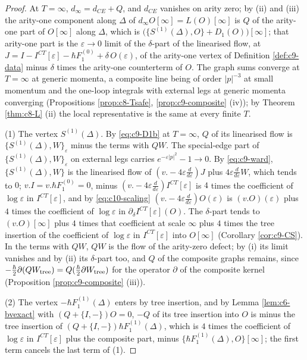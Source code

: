 \begin{proof}
At $T=\infty$, $d_\infty=d_{CE}+Q$, and $d_{CE}$ vanishes on arity zero; by (ii) and (iii) the arity-one component along $\Delta$ of $d_\infty O[\infty]=L(O)[\infty]$ is $Q$ of the arity-one part of $O[\infty]$ along $\Delta$, which is $\big(\{S^{(1)}(\Delta),O\}+D_1(O)\big)[\infty]$; that arity-one part is the $\varepsilon\to0$ limit of the $\delta$-part of the linearised flow, at $J=I-I^{CT}[\varepsilon]-\hbar F_1^{(0)}+\delta\,O(\varepsilon)$, of the arity-one vertex of Definition \ref{def:c9-data} minus $\delta$ times the arity-one counterterm of $O$. The graph sums converge at $T=\infty$ at generic momenta, a composite line being of order $|p|^{-3}$ at small momentum and the one-loop integrals with external legs at generic momenta converging (Propositions \ref{prop:c8-Tsafe}, \ref{prop:c9-composite} (iv)); by Theorem \ref{thm:c8-L} (ii) the local representative is the same at every finite $T$.

(1) The vertex $S^{(1)}(\Delta)$. By \eqref{eq:c9-D1b} at $T=\infty$, $Q$ of its linearised flow is $\{S^{(1)}(\Delta),W\}_\varepsilon$ minus the terms with $QW$. The special-edge part of $\{S^{(1)}(\Delta),W\}_\varepsilon$ on external legs carries $e^{-\varepsilon|p|^2}-1\to0$. By \eqref{eq:c9-ward}, $\{S^{(1)}(\Delta),W\}$ is the linearised flow of $(v.-4\varepsilon\frac d{d\varepsilon})J$ plus $4\varepsilon\frac d{d\varepsilon}W$, which tends to $0$; $v.I=v.\hbar F_1^{(0)}=0$, minus $(v.-4\varepsilon\frac d{d\varepsilon})I^{CT}[\varepsilon]$ is $4$ times the coefficient of $\log\varepsilon$ in $I^{CT}[\varepsilon]$, and by \eqref{eq:c10-scaling} $(v.-4\varepsilon\frac d{d\varepsilon})O(\varepsilon)$ is $(v.O)(\varepsilon)$ plus $4$ times the coefficient of $\log\varepsilon$ in $\partial_\delta I^{CT}[\varepsilon](O)$. The $\delta$-part tends to $(v.O)[\infty]$ plus $4$ times that coefficient at scale $\infty$ plus $4$ times the tree insertion of the coefficient of $\log\varepsilon$ in $I^{CT}[\varepsilon]$ into $O[\infty]$ (Corollary \ref{cor:c9-CS}). In the terms with $QW$, $QW$ is the flow of the arity-zero defect; by (i) its limit vanishes and by (ii) its $\delta$-part too, and $Q$ of the composite graphs remains, since $-\tfrac\hbar2\partial(QW_{\rm tree})=Q(\tfrac\hbar2\partial W_{\rm tree})$ for the operator $\partial$ of the composite kernel (Proposition \ref{prop:c9-composite} (iii)).

(2) The vertex $-\hbar F_1^{(1)}(\Delta)$ enters by tree insertion, and by Lemma \ref{lem:c6-bvexact} with $(Q+\{I,-\})O=0$, $-Q$ of its tree insertion into $O$ is minus the tree insertion of $(Q+\{I,-\})\hbar F_1^{(1)}(\Delta)$, which is $4$ times the coefficient of $\log\varepsilon$ in $I^{CT}[\varepsilon]$ plus the composite part, minus $\{\hbar F_1^{(1)}(\Delta),O\}[\infty]$; the first term cancels the last term of (1).


\end{proof}
